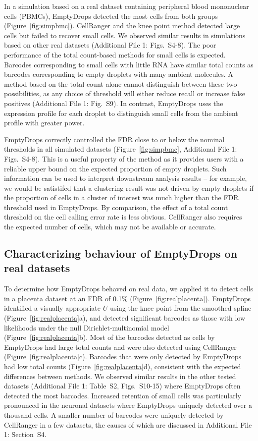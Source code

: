 \documentclass{bmcart}
\newcommand{\ADD}[1]{Additional File 1: #1}
\newcommand{\supptabdataset}{S2}
\newcommand{\suppfigsimresults}{S4-8}
\newcommand{\suppfigsimrocs}{S9}
\newcommand{\suppfigrealresults}{S10-15}
\newcommand{\suppsecpower}{S4}
\begin{document}
In a simulation based on a real dataset containing peripheral blood mononuclear cells (PBMCs), EmptyDrops detected the most cells from both groups (Figure~\ref{fig:simpbmc}).
CellRanger and the knee point method detected large cells but failed to recover small cells.
We observed similar results in simulations based on other real datasets (\ADD{Figs.~\suppfigsimresults{}}).
The poor performance of the total count-based methods for small cells is expected.
Barcodes corresponding to small cells with little RNA have similar total counts as barcodes corresponding to empty droplets with many ambient molecules.
A method based on the total count alone cannot distinguish between these two possibilities, 
as any choice of threshold will either reduce recall or increase false positives (\ADD{Fig.~\suppfigsimrocs{}}).
In contrast, EmptyDrops uses the expression profile for each droplet to distinguish small cells from the ambient profile with greater power.

EmptyDrops correctly controlled the FDR close to or below the nominal thresholds in all simulated datasets (Figure~\ref{fig:simpbmc}, \ADD{Figs.~\suppfigsimresults{}}).
This is a useful property of the method as it provides users with a reliable upper bound on the expected proportion of empty droplets.
Such information can be used to interpret downstream analysis results --
for example, we would be satistifed that a clustering result was not driven by empty droplets if the proportion of cells in a cluster of interest was much higher than the FDR threshold used in EmptyDrops.
By comparison, the effect of a total count threshold on the cell calling error rate is less obvious.
CellRanger also requires the expected number of cells, which may not be available or accurate.

\subsection*{Characterizing behaviour of EmptyDrops on real datasets}
To determine how EmptyDrops behaved on real data, we applied it to detect cells in a placenta dataset \cite{vento2018single} at an FDR of 0.1\% (Figure~\ref{fig:realplacenta}).
EmptyDrops identified a visually appropriate $U$ using the knee point from the smoothed spline (Figure~\ref{fig:realplacenta}a),
and detected significant barcodes as those with low likelihoods under the null Dirichlet-multinomial model (Figure~\ref{fig:realplacenta}b).
Most of the barcodes detected as cells by EmptyDrops had large total counts and were also detected using CellRanger (Figure~\ref{fig:realplacenta}c). 
Barcodes that were only detected by EmptyDrops had low total counts (Figure~\ref{fig:realplacenta}d), consistent with the expected differences between methods.
We observed similar results in the other tested datasets (\ADD{Table~\supptabdataset{}, Figs.~\suppfigrealresults{}})
where EmptyDrops often detected the most barcodes.
Increased retention of small cells was particularly pronounced in the neuronal datasets where EmptyDrops uniquely detected over a thousand cells.
A smaller number of barcodes were uniquely detected by CellRanger in a few datasets, the causes of which are discussed in \ADD{Section~\suppsecpower{}}.
\end{document}
